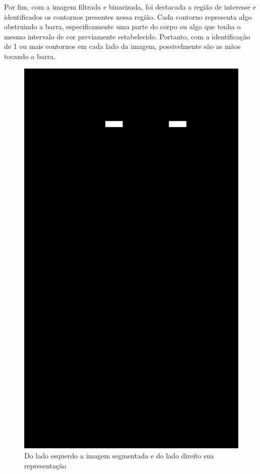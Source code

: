 Por fim, com a imagem filtrada e binarizada, foi destacada a região de interesse e identificados os contornos presentes nessa região. Cada contorno representa algo obstruindo a barra, especificamente uma parte do corpo ou algo que tenha o mesmo intervalo de cor previamente estabelecido. Portanto, com a identificação de 1 ou mais contornos em cada lado da imagem, possivelmente são as mãos tocando a barra.

\begin{figure}[H]
    \centering
    \caption{Do lado esquerdo a imagem segmentada e do lado direito sua representação}
        \begin{minipage}{\sizeImg\textwidth}
            \includegraphics[width=\textwidth]{figuras/mao_barra/only_hands.png}

\end{minipage}
\end{figure}
